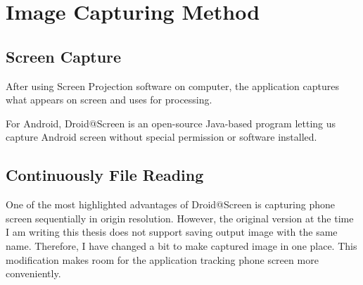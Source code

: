 \chapter{Image Capturing Method}

\section{Screen Capture}
After using Screen Projection software on computer, the application captures what appears on screen and uses for processing.

For Android, Droid@Screen \cite{droid_screen} is an open-source Java-based program letting us capture Android screen without special permission or software installed.

\section{Continuously File Reading}
One of the most highlighted advantages of Droid@Screen is capturing phone screen sequentially in origin resolution. However, the original version at the time I am writing this thesis does not support saving output image with the same name. Therefore, I have changed a bit to make captured image in one place. This modification makes room for the application tracking phone screen more conveniently.